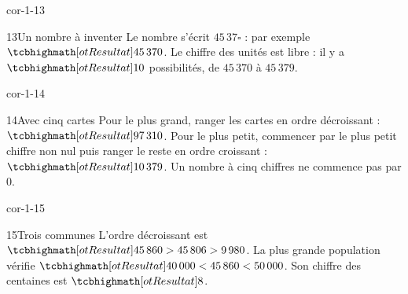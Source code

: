 \begin{blocLivre}{cor-1-13}\begin{corrige}{13}{Un nombre à inventer}
Le nombre s’écrit $45\,37\square$ : par exemple $\res{45\,370}$. Le chiffre des unités est libre : il y a $\res{10}$ possibilités, de $45\,370$ à $45\,379$.
\end{corrige}\end{blocLivre}
\begin{blocLivre}{cor-1-14}\begin{corrige}{14}{Avec cinq cartes}
Pour le plus grand, ranger les cartes en ordre décroissant : $\res{97\,310}$. Pour le plus petit, commencer par le plus petit chiffre non nul puis ranger le reste en ordre croissant : $\res{10\,379}$. Un nombre à cinq chiffres ne commence pas par 0.
\end{corrige}\end{blocLivre}
\begin{blocLivre}{cor-1-15}\begin{corrige}{15}{Trois communes}
L’ordre décroissant est $\res{45\,860>45\,806>9\,980}$. La plus grande population vérifie $\res{40\,000<45\,860<50\,000}$. Son chiffre des centaines est $\res8$.
\end{corrige}\end{blocLivre}
